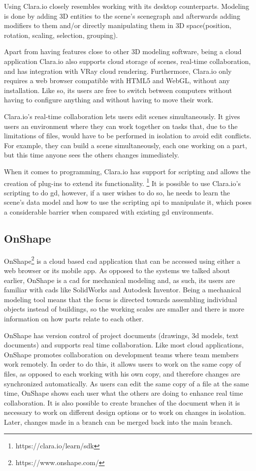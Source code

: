 Using Clara.io closely resembles working with its desktop counterparts.
Modeling is done by adding 3D entities to the scene's scenegraph and afterwards adding modifiers to them and/or directly manipulating them in 3D space(position, rotation, scaling, selection, grouping).

Apart from having features close to other 3D modeling software, being a cloud application Clara.io also supports cloud storage of scenes, real-time collaboration, and has integration with VRay cloud rendering.
Furthermore, Clara.io only requires a web browser compatible with HTML5 and WebGL, without any installation.
Like so, its users are free to switch between computers without having to configure anything and without having to move their work.

Clara.io's real-time collaboration lets users edit scenes simultaneously.
It gives users an environment where they can work together on tasks that, due to the limitations of files, would have to be performed in isolation to avoid edit conflicts.
For example, they can build a scene simultaneously, each one working on a part, but this time anyone sees the others changes immediately.

When it comes to programming, Clara.io has support for scripting and allows the creation of plug-ins to extend its functionality.%
\footnote{https://clara.io/learn/sdk}
It is possible to use Clara.io's scripting to do \gls{gd}, however, if a user wishes to do so, he needs to learn the scene's data model and how to use the scripting \gls{api} to manipulate it, which poses a considerable barrier when compared with existing \gls{gd} environments.


\subsection{OnShape}
OnShape\footnote{https://www.onshape.com/} is a cloud based \gls{cad} application that can be accessed using either a web browser or its mobile app.
As opposed to the systems we talked about earlier, OnShape is a \gls{cad} for mechanical modeling and, as such, its users are familiar with \glspl{cad} like SolidWorks and Autodesk Inventor.
Being a mechanical modeling tool means that the focus is directed towards assembling individual objects instead of buildings, so the working scales are smaller and there is more information on how parts relate to each other.

OnShape has version control of project documents (drawings, 3d models, text documents) and supports real time collaboration.
Like most cloud applications, OnShape promotes collaboration on development teams where team members work remotely.
In order to do this, it allows users to work on the same copy of files, as opposed to each working with his own copy, and therefore changes are synchronized automatically.
As users can edit the same copy of a file at the same time, OnShape shows each user what the others are doing to enhance real time collaboration.
It is also possible to create branches of the document when it is necessary to work on different design options or to work on changes in isolation.
Later, changes made in a branch can be merged back into the main branch.

